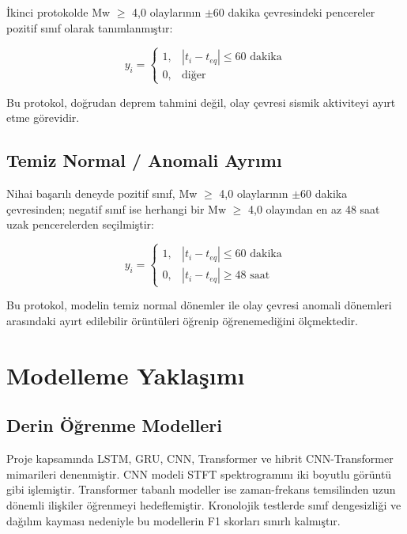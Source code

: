 İkinci protokolde Mw $\geq$ 4,0 olaylarının $\pm$60 dakika çevresindeki pencereler pozitif sınıf olarak tanımlanmıştır:

\begin{equation}
y_i = \begin{cases}
1, & |t_i - t_{eq}| \leq 60\text{ dakika} \\
0, & \text{diğer}
\end{cases}
\end{equation}

Bu protokol, doğrudan deprem tahmini değil, olay çevresi sismik aktiviteyi ayırt etme görevidir.

\subsection{Temiz Normal / Anomali Ayrımı}

Nihai başarılı deneyde pozitif sınıf, Mw $\geq$ 4,0 olaylarının $\pm$60 dakika çevresinden; negatif sınıf ise herhangi bir Mw $\geq$ 4,0 olayından en az 48 saat uzak pencerelerden seçilmiştir:

\begin{equation}
y_i = \begin{cases}
1, & |t_i - t_{eq}| \leq 60\text{ dakika} \\
0, & |t_i - t_{eq}| \geq 48\text{ saat}
\end{cases}
\end{equation}

Bu protokol, modelin temiz normal dönemler ile olay çevresi anomali dönemleri arasındaki ayırt edilebilir örüntüleri öğrenip öğrenemediğini ölçmektedir.

\section{Modelleme Yaklaşımı}

\subsection{Derin Öğrenme Modelleri}

Proje kapsamında LSTM, GRU, CNN, Transformer ve hibrit CNN-Transformer mimarileri denenmiştir. CNN modeli STFT spektrogramını iki boyutlu görüntü gibi işlemiştir. Transformer tabanlı modeller ise zaman-frekans temsilinden uzun dönemli ilişkiler öğrenmeyi hedeflemiştir. Kronolojik testlerde sınıf dengesizliği ve dağılım kayması nedeniyle bu modellerin F1 skorları sınırlı kalmıştır.

